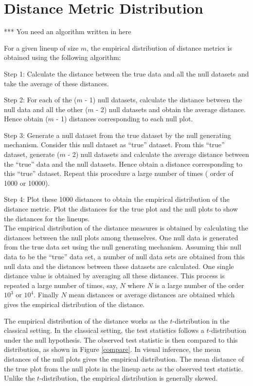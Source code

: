 \documentclass[12]{article}
\newcommand{\red}[1]{{\color{red} #1}}
\begin{document}
\section{Distance Metric Distribution} \label{sec:distri}

\red{*** You need an algorithm written in here}

For a given lineup of size $m$, the empirical distribution of distance metrics is obtained using the following algorithm:

Step 1: Calculate the distance between the true data and all the null datasets and take the average of these distances. 

Step 2: For each of the ($m$ - 1) null datasets, calculate the distance between the null data and all the other ($m$ - 2) null datasets and obtain the average distance. Hence obtain ($m$ - 1) distances corresponding to each null plot.

Step 3: Generate a null dataset from the true dataset by the null generating mechanism. Consider this null dataset as ``true'' dataset. From this ``true'' dataset, generate ($m$ - 2) null datasets and calculate the average distance between the ``true'' data and the null datasets. Hence obtain a distance corresponding to this ``true'' dataset. Repeat this procedure a large number of times ( order of 1000 or 10000).

Step 4: Plot these 1000 distances to obtain the empirical distribution of the distance metric. Plot the distances for the true plot and the null plots to show the distances for the lineups. \\



The empirical distribution of the distance measures is obtained by calculating the distances between the null plots among themselves. One null data is generated from the true data set using the null generating mechanism. Assuming this null data to be the ``true'' data set, a number of null data sets are obtained from this null data and the distances between these datasets are calculated. One single distance value is obtained by averaging all these distances. This process is repeated a large number of times, say, $N$ where $N$ is a large number of the order $10^3$ or $10^4$. Finally $N$ mean distances or average distances are obtained which gives the empirical distribution of the distance. 

The empirical distribution of the distance works as the $t$-distribution in the classical setting. In the classical setting, the test statistics follows a $t$-distribution under the null hypothesis. The observed test statistic is then compared to this distribution, as shown in Figure \ref{compare}. In visual inference, the mean distances of the null plots gives the empirical distribution. The mean distance of the true plot from the null plots in the lineup acts as the observed test statistic. Unlike the $t$-distribution, the empirical distribution is generally skewed.
\end{document}
